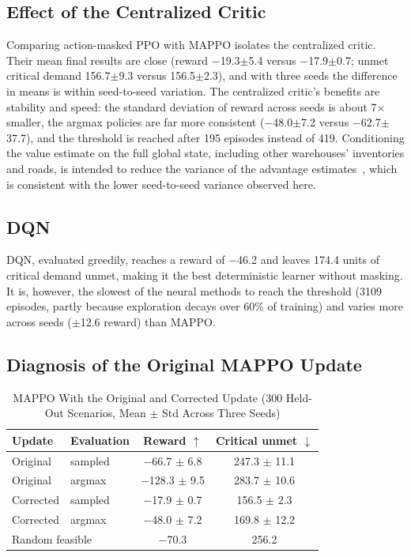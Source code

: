 \documentclass[conference]{IEEEtran}
\begin{document}
\subsection{Effect of the Centralized Critic}
Comparing action-masked PPO with MAPPO isolates the centralized critic. Their mean final results are close (reward $-$19.3$\pm$5.4 versus $-$17.9$\pm$0.7; unmet critical demand 156.7$\pm$9.3 versus 156.5$\pm$2.3), and with three seeds the difference in means is within seed-to-seed variation. The centralized critic's benefits are stability and speed: the standard deviation of reward across seeds is about 7$\times$ smaller, the argmax policies are far more consistent ($-$48.0$\pm$7.2 versus $-$62.7$\pm$37.7), and the threshold is reached after 195 episodes instead of 419. Conditioning the value estimate on the full global state, including other warehouses' inventories and roads, is intended to reduce the variance of the advantage estimates~\cite{b6}, which is consistent with the lower seed-to-seed variance observed here.

\subsection{DQN}
DQN, evaluated greedily, reaches a reward of $-$46.2 and leaves 174.4 units of critical demand unmet, making it the best deterministic learner without masking. It is, however, the slowest of the neural methods to reach the threshold (3109 episodes, partly because exploration decays over 60\% of training) and varies more across seeds ($\pm$12.6 reward) than MAPPO.

\subsection{Diagnosis of the Original MAPPO Update}

\begin{table}[htbp]
\caption{MAPPO With the Original and Corrected Update (300 Held-Out Scenarios, Mean $\pm$ Std Across Three Seeds)}
\label{tab:mappo}
\centering
\renewcommand{\arraystretch}{1.12}
\footnotesize
\begin{tabular}{llcc}
\toprule
\textbf{Update} & \textbf{Evaluation} & \textbf{Reward} $\uparrow$ & \textbf{Critical unmet} $\downarrow$ \\
\midrule
Original & sampled & $-$66.7 $\pm$ 6.8 & 247.3 $\pm$ 11.1 \\
Original & argmax & $-$128.3 $\pm$ 9.5 & 283.7 $\pm$ 10.6 \\
Corrected & sampled & $-$17.9 $\pm$ 0.7 & 156.5 $\pm$ 2.3 \\
Corrected & argmax & $-$48.0 $\pm$ 7.2 & 169.8 $\pm$ 12.2 \\
\midrule
\multicolumn{2}{l}{Random feasible} & $-$70.3 & 256.2 \\
\bottomrule
\end{tabular}
\end{table}
\end{document}
